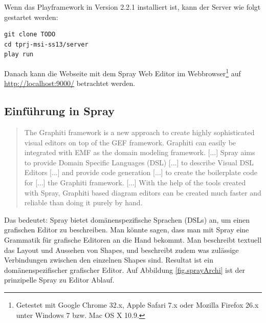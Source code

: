 \noindent Wenn das Playframework in Version 2.2.1 installiert ist,
kann der Server wie folgt gestartet werden:

\begin{verbatim}
git clone TODO
cd tprj-msi-ss13/server
play run
\end{verbatim}

\noindent Danach kann die Webseite mit dem Spray Web Editor im
Webbrowser\footnote{Getestet mit Google Chrome 32.x, Apple Safari 7.x oder Mozilla Firefox 26.x unter Windows 7 bzw. Mac OS X 10.9.}
auf \url{http://localhost:9000/} betrachtet werden.


\subsection{Einführung in Spray}

\begin{quote}
The Graphiti framework is a new approach to create highly sophisticated
visual editors on top of the GEF framework.
Graphiti can easily be integrated with EMF as the
domain modeling framework. [...]
Spray aims to provide Domain Specific Languages (DSL) [...]
to describe Visual DSL Editors [...]
and provide code generation [...] to create the boilerplate code
for [...] the Graphiti framework. [...]
With the help of the tools created with Spray,
Graphiti based diagram editors can be created much faster
and reliable than doing it purely by hand. \citep{sprayWebpage}
\end{quote}

\noindent Das bedeutet: Spray bietet domänenspezifische Sprachen (DSLs) an,
um einen grafischen Editor zu beschreiben. Man könnte sagen, dass
man mit Spray eine Grammatik für grafische Editoren an die Hand bekommt.
Man beschreibt textuell das Layout und Aussehen von Shapes, und beschreibt
zudem was zulässige Verbindungen zwischen den einzelnen Shapes sind.
Resultat ist ein domänenspezifischer grafischer Editor.
Auf Abbildung \ref{fig.sprayArchi} ist der prinzipelle Spray zu Editor Ablauf. 

